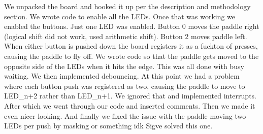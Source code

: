 We unpacked the board and hooked it up per the description and methodology section.
We wrote code to enable all the LEDs.
Once that was working we enabled the buttons.
Just one LED was enabled.
Button 0 moves the paddle right (logical shift did not work, used arithmetic shift).
Button 2 moves paddle left.
When either button is pushed down the board registers it as a fuckton of presses, causing the paddle to fly off.
We wrote code so that the paddle gets moved to the opposite side of the LEDs when it hits the edge.
This was all done with busy waiting.
We then implemented debouncing.
At this point we had a problem where each button push was registered as two, causing the paddle to move to LED_{n+2} rather than LED_{n+1}.
We ignored that and implemented interrupts.
After which we went through our code and inserted comments.
Then we made it even nicer looking.
And finally we fixed the issue with the paddle moving two LEDs per push by masking or something idk Sigve solved this one.